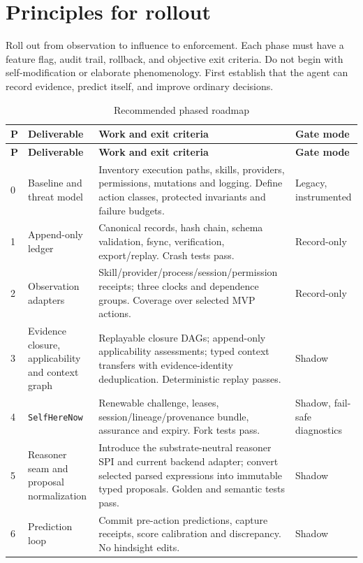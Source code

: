 \documentclass[11pt,oneside]{report}
\newcommand{\SelfHereNow}{\texttt{SelfHereNow}}
\begin{document}
\section{Principles for rollout}

Roll out from observation to influence to enforcement. Each phase must have a feature flag, audit trail, rollback, and objective exit criteria. Do not begin with self-modification or elaborate phenomenology. First establish that the agent can record evidence, predict itself, and improve ordinary decisions.

\begin{longtable}{@{}C{0.40in}L{1.40in}L{3.05in}L{1.55in}@{}}
\caption{Recommended phased roadmap}\label{tab:roadmap}\\
\toprule
\textbf{P} & \textbf{Deliverable} & \textbf{Work and exit criteria} & \textbf{Gate mode} \\
\midrule
\endfirsthead
\toprule
\textbf{P} & \textbf{Deliverable} & \textbf{Work and exit criteria} & \textbf{Gate mode} \\
\midrule
{} & Baseline and threat model & Inventory execution paths, skills, providers, permissions, mutations and logging. Define action classes, protected invariants and failure budgets. & Legacy, instrumented \\
1 & Append-only ledger & Canonical records, hash chain, schema validation, fsync, verification, export/replay. Crash tests pass. & Record-only \\
2 & Observation adapters & Skill/provider/process/session/permission receipts; three clocks and dependence groups. Coverage over selected MVP actions. & Record-only \\
3 & Evidence closure, applicability and context graph & Replayable closure DAGs; append-only applicability assessments; typed context transfers with evidence-identity deduplication. Deterministic replay passes. & Shadow \\
4 & \SelfHereNow{} & Renewable challenge, leases, session/lineage/provenance bundle, assurance and expiry. Fork tests pass. & Shadow, fail-safe diagnostics \\
5 & Reasoner seam and proposal normalization & Introduce the substrate-neutral reasoner SPI and current backend adapter; convert selected parsed expressions into immutable typed proposals. Golden and semantic tests pass. & Shadow \\
6 & Prediction loop & Commit pre-action predictions, capture receipts, score calibration and discrepancy. No hindsight edits. & Shadow \\

\end{longtable}
\end{document}

